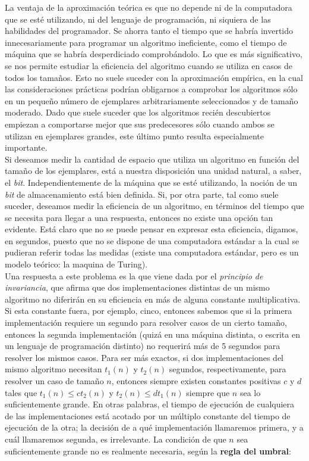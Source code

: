 \documentclass[a4paper,12pt]{article}
\begin{document}
La ventaja de la aproximación teórica es que no depende ni de la computadora que se esté utilizando, ni del lenguaje de programación, ni siquiera de las habilidades del programador. Se ahorra tanto el tiempo que se habría invertido innecesariamente para programar un algoritmo ineficiente, como el tiempo de máquina que se habría desperdiciado comprobándolo. Lo que es más significativo, se nos permite estudiar la eficiencia del algoritmo cuando se utiliza en casos de todos los tamaños. Esto no suele suceder con la aproximación empírica, en la cual las consideraciones prácticas podrían obligarnos a comprobar los algoritmos sólo en un pequeño número de ejemplares arbitrariamente seleccionados y de tamaño moderado. Dado que suele suceder que los algoritmos recién descubiertos empiezan a comportarse mejor que sus predecesores sólo cuando ambos se utilizan en ejemplares grandes, este último punto resulta especialmente importante. \\

Si deseamos medir la cantidad de espacio que utiliza un algoritmo en función del tamaño de los ejemplares, está a nuestra disposición una unidad natural, a saber, el \emph{bit}. Independientemente de la máquina que se esté utilizando, la noción de un \emph{bit} de almacenamiento está bien definida. Si, por otra parte, tal como suele suceder, deseamos medir la eficiencia de un algoritmo, en términos del tiempo que se necesita para llegar a una respuesta, entonces no existe una opción tan evidente. Está claro que no se puede pensar en expresar esta eficiencia, digamos, en segundos, puesto que no se dispone de una computadora estándar a la cual se pudieran referir todas las medidas (existe una computadora estándar, pero es un modelo teórico: la maquina de Turing).\\

Una respuesta a este problema es la que viene dada por el \emph{principio de invariancia}, que afirma que dos implementaciones distintas de un mismo algoritmo no diferirán en su eficiencia en más de alguna constante multiplicativa. Si esta constante fuera, por ejemplo, cinco, entonces sabemos que si la primera implementación requiere un segundo para resolver casos de un cierto tamaño, entonces la segunda implementación (quizá en una máquina distinta, o escrita en un lenguaje de programación distinto) no requerirá más de 5 segundos para resolver los mismos casos. Para ser más exactos, si dos implementaciones del mismo algoritmo necesitan $t_1(n)$ y $t_2(n)$ segundos, respectivamente, para resolver un caso de tamaño $n$, entonces siempre existen constantes positivas $c$ y $d$ tales que $t_1(n) \leq ct_2(n)$ y $t_2(n) \leq dt_1(n)$ siempre que $n$ sea lo suficientemente grande. En otras palabras, el tiempo de ejecución de cualquiera de las implementaciones está acotado por un múltiplo constante del tiempo de ejecución de la otra; la decisión de a qué implementación llamaremos primera, y a cuál llamaremos segunda, es irrelevante. La condición de que $n$ sea suficientemente grande no es realmente necesaria, según la \textbf{regla del umbral}:\\
\end{document}
